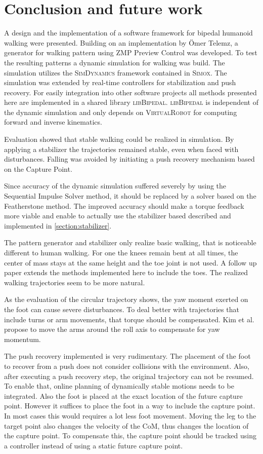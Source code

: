 \documentclass[english,ngerman]{KITreprt}
\newcommand{\name}[1]{\textsc{#1}}
\begin{document}
\chapter{Conclusion and future work}\label{conclusion-and-future-work}

A design and the implementation of a software framework for bipedal
humanoid walking were presented. Building on an implementation by Ömer
Telemz, a generator for walking pattern using ZMP Preview Control was
developed. To test the resulting patterns a dynamic simulation for
walking was build. The simulation utilizes the \name{SimDynamics}
framework contained in \name{Simox}. The simulation was extended by
real-time controllers for stabilization and push recovery. For easily
integration into other software projects all methods presented here are
implemented in a shared library \name{libBipedal}. \name{libBipedal} is
independent of the dynamic simulation and only depends on
\name{VirtualRobot} for computing forward and inverse kinematics.

Evaluation showed that stable walking could be realized in simulation.
By applying a stabilizer the trajectories remained stable, even when
faced with disturbances. Falling was avoided by initiating a push
recovery mechanism based on the Capture Point.

Since accuracy of the dynamic simulation suffered severely by using the
Sequential Impulse Solver method, it should be replaced by a solver
based on the Featherstone method. The improved accuracy should make a
torque feedback more viable and enable to actually use the stabilizer
based described and implemented in \ref{section:stabilizer}.

The pattern generator and stabilizer only realize basic walking, that is
noticeable different to human walking. For one the knees remain bent at
all times, the center of mass stays at the same height and the toe joint
is not used. A follow up paper \cite{kajita2012evaluation} extends the
methods implemented here to include the toes. The realized walking
trajectories seem to be more natural.

As the evaluation of the circular trajectory shows, the yaw moment
exerted on the foot can cause severe disturbances. To deal better with
trajectories that include turns or arm movements, that torque should be
compensated. Kim et al.\cite{kim2005humanoid} propose to move the arms
around the roll axis to compensate for yaw momentum.

The push recovery implemented is very rudimentary. The placement of the
foot to recover from a push does not consider collisions with the
environment. Also, after executing a push recovery step, the original
trajectory can not be resumed. To enable that, online planning of
dynamically stable motions needs to be integrated. Also the foot is
placed at the exact location of the future capture point. However it
suffices to place the foot in a way to include the capture point. In
most cases this would requires a lot less foot movement. Moving the leg
to the target point also changes the velocity of the CoM, thus changes
the location of the capture point. To compensate this, the capture point
should be tracked using a controller instead of using a static future
capture point.




\end{document}
